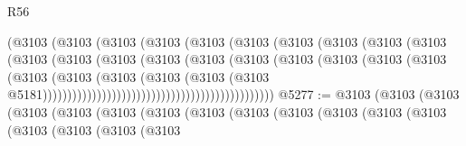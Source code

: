 \begin{lexlean}{R56}
\begin{coremodule}
                                              (@3103
                                                (@3103
                                                  (@3103
                                                    (@3103
                                                      (@3103
                                                        (@3103
                                                          (@3103
                                                            (@3103
                                                              (@3103
                                                                (@3103
                                                                  (@3103
                                                                    (@3103
                                                                      (@3103
                                                                        (@3103
                                                                          (@3103
                                                                            (@3103
                                                                              (@3103
                                                                                (@3103
                                                                                  (@3103
                                                                                    (@3103
                                                                                      (@3103
                                                                                        (@3103
                                                                                          (@3103
                                                                                            (@3103
                                                                                              (@3103
                                                                                                (@3103
                                                                                                  @5181)))))))))))))))))))))))))))))))))))))))))))))))
@5277 := @3103
    (@3103
      (@3103
        (@3103
          (@3103
            (@3103
              (@3103
                (@3103
                  (@3103
                    (@3103
                      (@3103
                        (@3103
                          (@3103
                            (@3103
                              (@3103
                                (@3103
                                  (@3103

\end{coremodule}
\end{lexlean}
